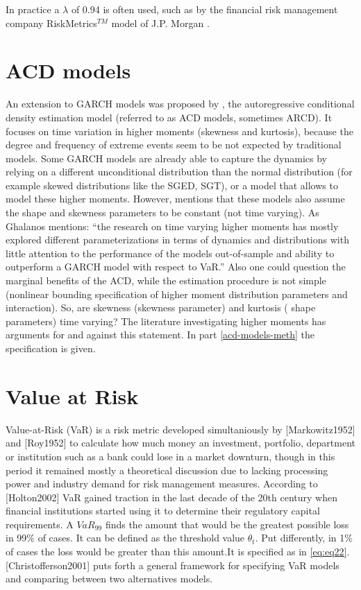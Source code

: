 \documentclass[a4paper, twoside]{templates/ociamthesis}
\begin{document}
In practice a \(\lambda\) of 0.94 is often used, such as by the financial risk management company RiskMetrics\(^{TM}\) model of J.P. Morgan \autocite{morganguarantytrustcompany1996}.

\hypertarget{acd-models}{%
\section{ACD models}\label{acd-models}}

An extension to GARCH models was proposed by \textcite{hansen1994}, the autoregressive conditional density estimation model (referred to as ACD models, sometimes ARCD). It focuses on time variation in higher moments (skewness and kurtosis), because the degree and frequency of extreme events seem to be not expected by traditional models. Some GARCH models are already able to capture the dynamics by relying on a different unconditional distribution than the normal distribution (for example skewed distributions like the SGED, SGT), or a model that allows to model these higher moments. However, \textcite{ghalanos2016} mentions that these models also assume the shape and skewness parameters to be constant (not time varying). As Ghalanos mentions: ``the research on time varying higher moments has mostly explored different parameterizations in terms of dynamics and distributions with little attention to the performance of the models out-of-sample and ability to outperform a GARCH model with respect to VaR.'' Also one could question the marginal benefits of the ACD, while the estimation procedure is not simple (nonlinear bounding specification of higher moment distribution parameters and interaction). So, are skewness (skewness parameter) and kurtosis ( shape parameters) time varying? The literature investigating higher moments has arguments for and against this statement. In part \ref{acd-models-meth} the specification is given.

\newpage

\hypertarget{value-at-risk}{%
\section{Value at Risk}\label{value-at-risk}}

Value-at-Risk (VaR) is a risk metric developed simultaniously by {[}Markowitz1952{]} and {[}Roy1952{]} to calculate how much money an investment, portfolio, department or institution such as a bank could lose in a market downturn, though in this period it remained mostly a theoretical discussion due to lacking processing power and industry demand for risk management measures. According to {[}Holton2002{]} VaR gained traction in the last decade of the 20th century when financial institutions started using it to determine their regulatory capital requirements. A \(VaR_{99}\) finds the amount that would be the greatest possible loss in 99\% of cases. It can be defined as the threshold value \(\theta_t\). Put differently, in 1\% of cases the loss would be greater than this amount.It is specified as in \eqref{eq:eq22}. {[}Christofferson2001{]} puts forth a general framework for specifying VaR models and comparing between two alternatives models.
\end{document}
